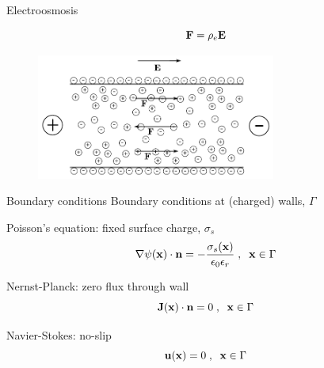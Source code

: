 \begin{frame}{Electroosmosis}

\begin{equation}
\mathbf{F} = \mathrm{\rho}_e \mathbf{E}
\end{equation}

\begin{figure}
\begin{center}
\includegraphics[width=0.7\textwidth]{../fig/channel_electroosmosis.pdf}
\end{center}
\end{figure}

\end{frame}

\begin{frame}{Boundary conditions}
Boundary conditions at (charged) walls, $\Gamma$

\begin{itemize*}
\item Poisson's equation: fixed surface charge, $\sigma_s$
\begin{equation}\label{eq:et:fix_c}
\nabla\psirm(\x) \cdot \n =
-\frac{\sigma_s(\x)}{\epsilon_0\epsilon_r}\;,\;\; \x \in \Gamma
\end{equation}

\item Nernst-Planck: zero flux through wall
\begin{equation}\label{eq:et:j0}
\J(\x) \cdot \mathbf{n} = 0 \;,\;\; \x \in \Gamma
\end{equation}

\item Navier-Stokes: no-slip
\begin{equation}
\mathbf{u}(\mathbf{x}) = 0 \;,\;\; \mathbf{x} \in \Gamma
\end{equation} 

\end{itemize*}
\end{frame}
